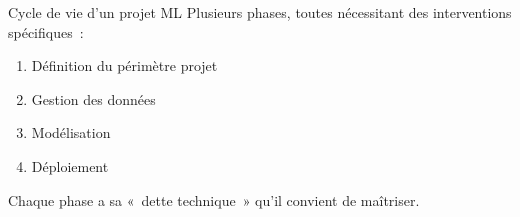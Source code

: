 
\begin{frame}{Cycle de vie d'un projet ML}
  Plusieurs phases, toutes nécessitant des interventions spécifiques~:

  \begin{enumerate}
    \item Définition du périmètre projet
    \item Gestion des données
    \item Modélisation
    \item Déploiement
  \end{enumerate}

  Chaque phase a sa « dette technique » qu'il convient de maîtriser.
\end{frame}
